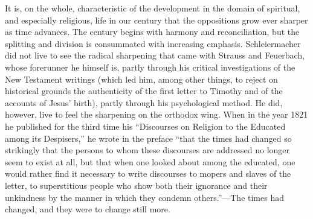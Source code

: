 \documentclass[12pt,a4paper]{book}
\newcommand{\opage}[1]{\marginnote{\footnotesize\textit{[#1]}}}
\begin{document}
It is, on the whole, characteristic of the development in the domain of
spiritual, and especially religious, life in our century that the
oppositions grow ever sharper as time advances. The century begins with
harmony and reconciliation, but the splitting and division is consummated
with increasing emphasis. Schleiermacher
\opage{10}did not live to see the radical sharpening that came with Strauss and
Feuerbach, whose forerunner he himself is, partly through his critical
investigations of the New Testament writings (which led him, among other
things, to reject on historical grounds the authenticity of the first
letter to Timothy and of the accounts of Jesus' birth), partly through
his psychological method. He did, however, live to feel the sharpening on
the orthodox wing. When in the year 1821 he published for the third time
his ``Discourses on Religion to the Educated among its Despisers,'' he
wrote in the preface ``that the times had changed so strikingly that the
persons to whom these discourses are addressed no longer seem to exist at
all, but that when one looked about among the educated, one would rather
find it necessary to write discourses to mopers and slaves of the letter,
to superstitious people who show both their ignorance and their
unkindness by the manner in which they condemn others.''---The times had
changed, and they were to change still more.
\end{document}
